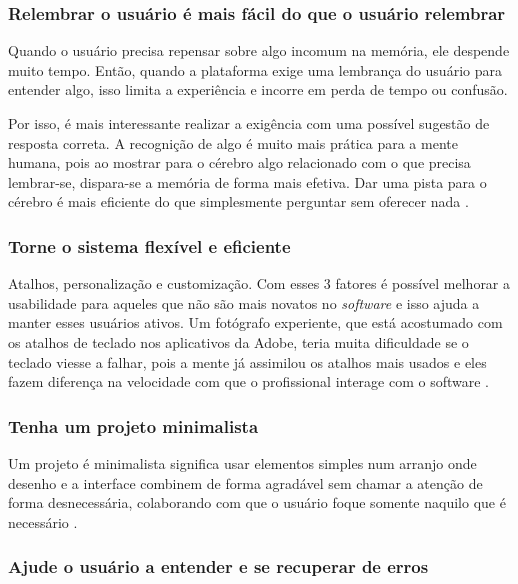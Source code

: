 \subsubsection{Relembrar o usuário é mais fácil do que o usuário relembrar}

Quando o usuário precisa repensar sobre algo incomum na memória, ele despende muito tempo. Então, quando a plataforma exige uma lembrança do usuário para entender algo, isso limita a experiência e incorre em perda de tempo ou confusão.

Por isso, é mais interessante realizar a exigência com uma possível sugestão de resposta correta. A recognição de algo é muito mais prática para a mente humana, pois ao mostrar para o cérebro algo relacionado com o que precisa lembrar-se, dispara-se a memória de forma mais efetiva. Dar uma pista para o cérebro é mais eficiente do que simplesmente perguntar sem oferecer nada \cite{site:nielsenRecall}.

\subsubsection{Torne o sistema flexível e eficiente}

Atalhos, personalização e customização. Com esses 3 fatores é possível melhorar a usabilidade para aqueles que não são mais novatos no \textit{software} e isso ajuda a manter esses usuários ativos. Um fotógrafo experiente, que está acostumado com os atalhos de teclado nos aplicativos da Adobe, teria muita dificuldade se o teclado viesse a falhar, pois a mente já assimilou os atalhos mais usados e eles fazem diferença na velocidade com que o profissional interage com o software \cite{site:nielsenFlexibility}.

\subsubsection{Tenha um projeto minimalista}

Um projeto é minimalista significa usar elementos simples num arranjo onde desenho e a interface combinem de forma agradável sem chamar a atenção de forma desnecessária, colaborando com que o usuário foque somente naquilo que é necessário \cite{site:nielsen}.

\subsubsection{Ajude o usuário a entender e se recuperar de erros}

